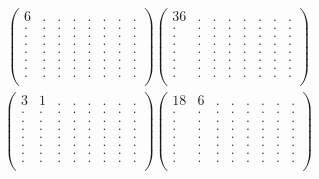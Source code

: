 \documentclass[12pt,a4paper]{amsart}
\begin{document}
\begin{align*}
\left(\begin{array}{rrrrrrrr}%
6&.&.&.&.&.&.&.\\%
.&.&.&.&.&.&.&.\\%
.&.&.&.&.&.&.&.\\%
.&.&.&.&.&.&.&.\\%
.&.&.&.&.&.&.&.\\%
.&.&.&.&.&.&.&.\\%
.&.&.&.&.&.&.&.\\%
.&.&.&.&.&.&.&.\\%
\end{array}\right)%
\left(\begin{array}{rrrrrrrr}%
36&.&.&.&.&.&.&.\\%
.&.&.&.&.&.&.&.\\%
.&.&.&.&.&.&.&.\\%
.&.&.&.&.&.&.&.\\%
.&.&.&.&.&.&.&.\\%
.&.&.&.&.&.&.&.\\%
.&.&.&.&.&.&.&.\\%
.&.&.&.&.&.&.&.\\%
\end{array}\right)%
\end{align*}
\begin{align*}
\left(\begin{array}{rrrrrrrr}%
3&1&.&.&.&.&.&.\\%
.&.&.&.&.&.&.&.\\%
.&.&.&.&.&.&.&.\\%
.&.&.&.&.&.&.&.\\%
.&.&.&.&.&.&.&.\\%
.&.&.&.&.&.&.&.\\%
.&.&.&.&.&.&.&.\\%
.&.&.&.&.&.&.&.\\%
\end{array}\right)%
\left(\begin{array}{rrrrrrrr}%
18&6&.&.&.&.&.&.\\%
.&.&.&.&.&.&.&.\\%
.&.&.&.&.&.&.&.\\%
.&.&.&.&.&.&.&.\\%
.&.&.&.&.&.&.&.\\%
.&.&.&.&.&.&.&.\\%
.&.&.&.&.&.&.&.\\%
.&.&.&.&.&.&.&.\\%
\end{array}\right)%
\end{align*}
\end{document}
